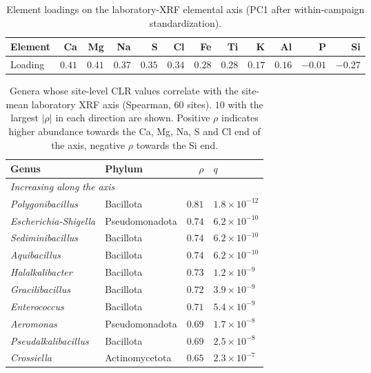 \begin{table}[htbp]
\centering\footnotesize
\caption{Element loadings on the laboratory-XRF elemental axis (PC1 after within-campaign standardization).}
\label{tab:xrf_loadings}
\setlength{\tabcolsep}{4pt}
\begin{tabular}{lrrrrrrrrrrr}
\toprule
Element & Ca & Mg & Na & S & Cl & Fe & Ti & K & Al & P & Si \\
\midrule
Loading & $0.41$ & $0.41$ & $0.37$ & $0.35$ & $0.34$ & $0.28$ & $0.28$
        & $0.17$ & $0.16$ & $-0.01$ & $-0.27$ \\
\bottomrule
\end{tabular}
\end{table}

\begin{table}[htbp]
\centering\footnotesize
\caption{Genera whose site-level CLR values correlate with the site-mean laboratory XRF axis (Spearman, $60$ sites). $10$ with the largest $|\rho|$ in each direction are shown. Positive $\rho$ indicates higher abundance towards the Ca, Mg, Na, S and Cl end of the axis, negative $\rho$ towards the Si end.}
\label{tab:xrf-genera}
\begin{tabular}{llrl}
\toprule
Genus & Phylum & $\rho$ & $q$ \\
\midrule
\multicolumn{4}{l}{\textit{Increasing along the axis}} \\
\textit{Polygonibacillus}     & Bacillota      & $0.81$ & $1.8\times10^{-12}$ \\
\textit{Escherichia-Shigella} & Pseudomonadota & $0.74$ & $6.2\times10^{-10}$ \\
\textit{Sediminibacillus}     & Bacillota      & $0.74$ & $6.2\times10^{-10}$ \\
\textit{Aquibacillus}         & Bacillota      & $0.74$ & $6.2\times10^{-10}$ \\
\textit{Halalkalibacter}      & Bacillota      & $0.73$ & $1.2\times10^{-9}$ \\
\textit{Gracilibacillus}      & Bacillota      & $0.72$ & $3.9\times10^{-9}$ \\
\textit{Enterococcus}         & Bacillota      & $0.71$ & $5.4\times10^{-9}$ \\
\textit{Aeromonas}            & Pseudomonadota & $0.69$ & $1.7\times10^{-8}$ \\
\textit{Pseudalkalibacillus}  & Bacillota      & $0.69$ & $2.5\times10^{-8}$ \\
\textit{Crossiella}           & Actinomycetota & $0.65$ & $2.3\times10^{-7}$ \\

\end{tabular}
\end{table}
